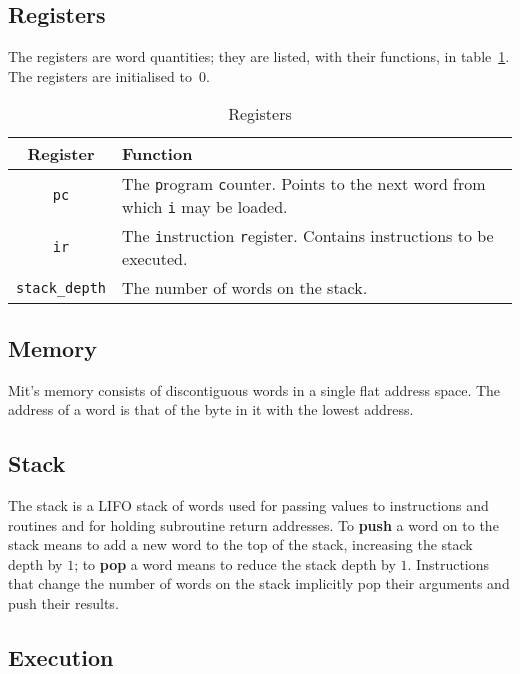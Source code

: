 \documentclass[a4paper]{article}
\begin{document}
\subsection{Registers}
\label{registers}

The registers are word quantities; they are listed, with their functions, in table~\ref{regtable}. The registers are initialised to~$0$.

\begin{table}[htbp]
\begin{center}
\begin{tabular}{cp{3.75in}} \toprule
\bf Register & \bf Function \\
 \midrule
{\tt pc} & The {\tt p}rogram {\tt c}ounter. Points to the next word from which {\tt i} may be loaded. \\
{\tt ir} & The {\tt i}nstruction {\tt r}egister. Contains instructions to be executed. \\
{\tt stack\_depth} & The number of words on the stack. \\
 \bottomrule
\end{tabular}
\caption{\label{regtable}Registers}
\end{center}
\end{table}


\subsection{Memory}

Mit's memory consists of discontiguous words in a single flat address space. The address of a word is that of the byte in it with the lowest address.


\subsection{Stack}

The stack is a LIFO stack of words used for passing values to instructions and routines and for holding subroutine return addresses. To {\bf push} a word on to the stack means to add a new word to the top of the stack, increasing the stack depth by $1$; to {\bf pop} a word means to reduce the stack depth by $1$. Instructions that change the number of words on the stack implicitly pop their arguments and push their results.


\subsection{Execution}
\label{execution}
\end{document}
